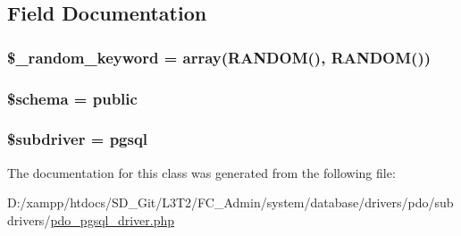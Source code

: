 \subsection{Field Documentation}
\hypertarget{class_c_i___d_b__pdo__pgsql__driver_a10213aa6e05f6d924d3277bb1d2fea00}{}
\subsubsection[{\$\+\_\+random\+\_\+keyword}]{\setlength{\rightskip}{0pt plus 5cm}\$\+\_\+random\+\_\+keyword = array(\textquotesingle{}R\+A\+N\+D\+O\+M()\textquotesingle{}, \textquotesingle{}R\+A\+N\+D\+O\+M()\textquotesingle{})\hspace{0.3cm}{\ttfamily [protected]}}\label{class_c_i___d_b__pdo__pgsql__driver_a10213aa6e05f6d924d3277bb1d2fea00}
\hypertarget{class_c_i___d_b__pdo__pgsql__driver_a83022b1d70799d2bde3d64dca9cb40ee}{}
\subsubsection[{\$schema}]{\setlength{\rightskip}{0pt plus 5cm}\$schema = \textquotesingle{}public\textquotesingle{}}\label{class_c_i___d_b__pdo__pgsql__driver_a83022b1d70799d2bde3d64dca9cb40ee}
\hypertarget{class_c_i___d_b__pdo__pgsql__driver_a1322ca756348b11d080cb7a4f590de15}{}
\subsubsection[{\$subdriver}]{\setlength{\rightskip}{0pt plus 5cm}\$subdriver = \textquotesingle{}pgsql\textquotesingle{}}\label{class_c_i___d_b__pdo__pgsql__driver_a1322ca756348b11d080cb7a4f590de15}


The documentation for this class was generated from the following file\+:\begin{DoxyCompactItemize}
\item 
D\+:/xampp/htdocs/\+S\+D\+\_\+\+Git/\+L3\+T2/\+F\+C\+\_\+\+Admin/system/database/drivers/pdo/subdrivers/\hyperlink{pdo__pgsql__driver_8php}{pdo\+\_\+pgsql\+\_\+driver.\+php}\end{DoxyCompactItemize}

